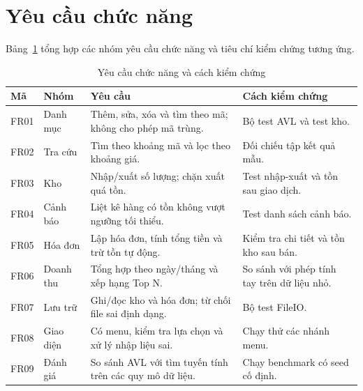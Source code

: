 \section{Yêu cầu chức năng}
Bảng~\ref{tab:yeucau_chucnang} tổng hợp các nhóm yêu cầu chức năng và tiêu chí kiểm chứng tương ứng.
\begin{table}[H]
\centering
\caption{Yêu cầu chức năng và cách kiểm chứng}
\label{tab:yeucau_chucnang}
\small
\begin{tabular}{@{}p{0.8cm}p{3.1cm}p{6.2cm}p{3.1cm}@{}}
\toprule
\textbf{Mã} & \textbf{Nhóm} & \textbf{Yêu cầu} & \textbf{Cách kiểm chứng} \\
\midrule
FR01 & Danh mục & Thêm, sửa, xóa và tìm theo mã; không cho phép mã trùng. & Bộ test AVL và test kho. \\
FR02 & Tra cứu & Tìm theo khoảng mã và lọc theo khoảng giá. & Đối chiếu tập kết quả mẫu. \\
FR03 & Kho & Nhập/xuất số lượng; chặn xuất quá tồn. & Test nhập-xuất và tồn sau giao dịch. \\
FR04 & Cảnh báo & Liệt kê hàng có tồn không vượt ngưỡng tối thiểu. & Test danh sách cảnh báo. \\
FR05 & Hóa đơn & Lập hóa đơn, tính tổng tiền và trừ tồn tự động. & Kiểm tra chi tiết và tồn kho sau bán. \\
FR06 & Doanh thu & Tổng hợp theo ngày/tháng và xếp hạng Top N. & So sánh với phép tính tay trên dữ liệu nhỏ. \\
FR07 & Lưu trữ & Ghi/đọc kho và hóa đơn; từ chối file sai định dạng. & Bộ test FileIO. \\
FR08 & Giao diện & Có menu, kiểm tra lựa chọn và xử lý nhập liệu sai. & Chạy thử các nhánh menu. \\
FR09 & Đánh giá & So sánh AVL với tìm tuyến tính trên các quy mô dữ liệu. & Chạy benchmark có seed cố định. \\
\bottomrule
\end{tabular}
\end{table}

